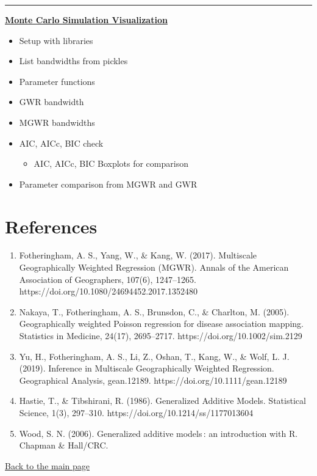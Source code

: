 \documentclass[11pt]{article}
\providecommand{\tightlist}{%
      \setlength{\itemsep}{0pt}\setlength{\parskip}{0pt}}
\begin{document}
\begin{center}\rule{0.5\linewidth}{\linethickness}\end{center}

    \textbf{\href{http://mehak-sachdeva.github.io/MGWR_book/Html/Poisson_MGWR_MonteCarlo_Results}{Monte
Carlo Simulation Visualization}}

\begin{itemize}
\tightlist
\item
  Setup with libraries
\item
  List bandwidths from pickles
\item
  Parameter functions
\item
  GWR bandwidth
\item
  MGWR bandwidths
\item
  AIC, AICc, BIC check

  \begin{itemize}
  \tightlist
  \item
    AIC, AICc, BIC Boxplots for comparison
  \end{itemize}
\item
  Parameter comparison from MGWR and GWR
\end{itemize}

    \section{References}\label{references}

    \begin{enumerate}
\def\labelenumi{\arabic{enumi}.}
\item
  Fotheringham, A. S., Yang, W., \& Kang, W. (2017). Multiscale
  Geographically Weighted Regression (MGWR). Annals of the American
  Association of Geographers, 107(6), 1247--1265.
  https://doi.org/10.1080/24694452.2017.1352480
\item
  Nakaya, T., Fotheringham, A. S., Brunsdon, C., \& Charlton, M. (2005).
  Geographically weighted Poisson regression for disease association
  mapping. Statistics in Medicine, 24(17), 2695--2717.
  https://doi.org/10.1002/sim.2129
\item
  Yu, H., Fotheringham, A. S., Li, Z., Oshan, T., Kang, W., \& Wolf, L.
  J. (2019). Inference in Multiscale Geographically Weighted Regression.
  Geographical Analysis, gean.12189. https://doi.org/10.1111/gean.12189
\item
  Hastie, T., \& Tibshirani, R. (1986). Generalized Additive Models.
  Statistical Science, 1(3), 297--310.
  https://doi.org/10.1214/ss/1177013604
\item
  Wood, S. N. (2006). Generalized additive models\,: an introduction
  with R. Chapman \& Hall/CRC.
\end{enumerate}

    \href{https://mehak-sachdeva.github.io/MGWR_book/}{Back to the main
page}


    
    
    
    
\end{document}
